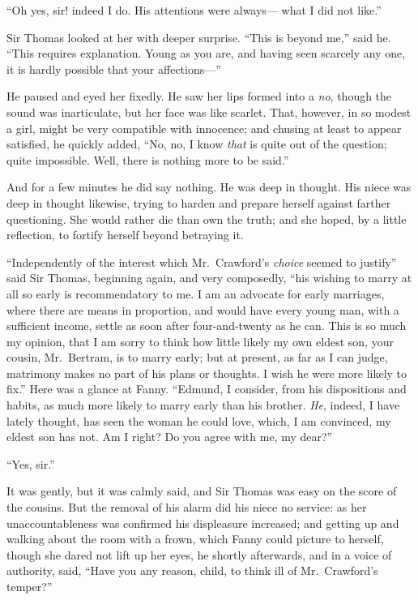 ``Oh yes, sir! indeed I do.  His attentions were always---%
what I did not like.''

Sir Thomas looked at her with deeper surprise.
``This is beyond me,'' said he.  ``This requires explanation.
Young as you are, and having seen scarcely any one,
it is hardly possible that your affections---''

He paused and eyed her fixedly.  He saw her lips
formed into a \emph{no}, though the sound was inarticulate,
but her face was like scarlet.  That, however, in so
modest a girl, might be very compatible with innocence;
and chusing at least to appear satisfied, he quickly added,
``No, no, I know \emph{that} is quite out of the question;
quite impossible.  Well, there is nothing more to be said.''

And for a few minutes he did say nothing.  He was deep
in thought.  His niece was deep in thought likewise, trying to
harden and prepare herself against farther questioning.
She would rather die than own the truth; and she hoped,
by a little reflection, to fortify herself beyond
betraying it.

``Independently of the interest which Mr.\ Crawford's \emph{choice}
seemed to justify'' said Sir Thomas, beginning again,
and very composedly, ``his wishing to marry at all so
early is recommendatory to me.  I am an advocate for
early marriages, where there are means in proportion,
and would have every young man, with a sufficient income,
settle as soon after four-and-twenty as he can.  This is
so much my opinion, that I am sorry to think how little
likely my own eldest son, your cousin, Mr.\ Bertram,
is to marry early; but at present, as far as I can judge,
matrimony makes no part of his plans or thoughts.
I wish he were more likely to fix.''  Here was a glance
at Fanny.  ``Edmund, I consider, from his dispositions
and habits, as much more likely to marry early than
his brother.  \emph{He}, indeed, I have lately thought,
has seen the woman he could love, which, I am convinced,
my eldest son has not.  Am I right?  Do you agree with me,
my dear?''

``Yes, sir.''

It was gently, but it was calmly said, and Sir Thomas was
easy on the score of the cousins.  But the removal of his
alarm did his niece no service:  as her unaccountableness
was confirmed his displeasure increased; and getting up
and walking about the room with a frown, which Fanny could
picture to herself, though she dared not lift up her eyes,
he shortly afterwards, and in a voice of authority, said,
``Have you any reason, child, to think ill of Mr.\ Crawford's
temper?''

